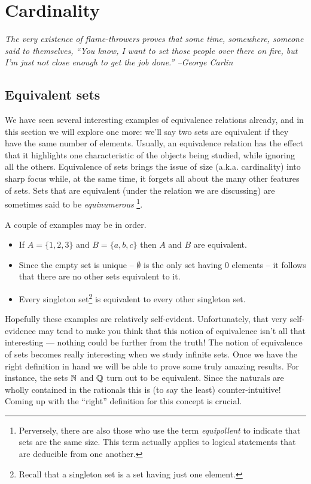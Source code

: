 
\chapter{Cardinality}
\label{ch:card}

{\em The very existence of flame-throwers proves that some time, 
somewhere, someone said to themselves, ``You know, I want to set 
those people over there on fire, but I'm just not close enough 
to get the job done.'' --George Carlin}

\section{Equivalent sets}
\label{sec:equiv_sets}

We have seen several interesting examples of equivalence relations 
already, and in this section we will explore one more: we'll say two sets are equivalent
if they have the same number of elements.  Usually, an equivalence relation
has the effect that it highlights one characteristic of the objects being studied,
while ignoring all the others.  Equivalence of sets brings the issue of size (a.k.a.
cardinality) into sharp focus while, at the same time, it forgets all about the
many other features of sets.  Sets that are equivalent (under the relation we
are discussing) are sometimes said to be 
\emph{equinumerous}
\footnote{Perversely, there are also those who use the term \emph{equipollent} 
to indicate that sets are the same size.  This term actually applies to 
logical statements that are deducible from one another.}.

A couple of examples may be in order.

\begin{itemize}
\item If $A = \{1, 2, 3\}$ and $B = \{a, b, c\}$ then $A$ and $B$ are equivalent.
\item Since the empty set is unique -- $\emptyset$ is the only set having 0 elements -- it
follows that there are no other sets equivalent to it.
\item Every singleton set\footnote{Recall that a 
singleton set is a set having just one element.} 
is equivalent to every other singleton set.
\end{itemize}

Hopefully these examples are relatively self-evident.  Unfortunately, that
very self-evidence may tend to make you think that this notion of equivalence
isn't all that interesting ---  nothing could be further from the truth! The
notion of equivalence of sets becomes really interesting when we study infinite
sets.  Once we have the right definition in hand we will be able to prove
some truly amazing results.  For instance, the sets ${\mathbb N}$ and ${\mathbb Q}$ turn out to be equivalent.  Since the naturals are wholly contained in the rationals this is (to say the least) counter-intuitive! Coming up with the ``right'' definition for this concept is crucial.

